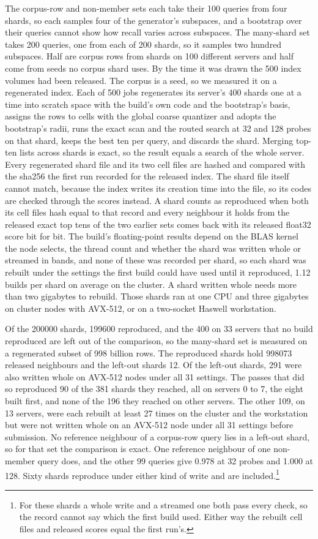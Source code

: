 \documentclass[sigconf, nonacm]{acmart}
\begin{document}
The corpus-row and non-member sets each take their 100 queries from four shards, so each samples
four of the generator's subspaces, and a bootstrap over their queries cannot show how recall varies
across subspaces. The many-shard set takes 200 queries, one from each of 200 shards, so it samples
two hundred subspaces. Half are corpus rows from shards on 100 different servers and half come from
seeds no corpus shard uses. By the time it was drawn the 500 index volumes had been released. The corpus is
a seed, so we measured it on a regenerated index. Each of 500 jobs regenerates its server's 400
shards one at a time into scratch space with the build's own code and the bootstrap's basis,
assigns the rows to cells with the global coarse quantizer and adopts the bootstrap's radii, runs
the exact scan and the routed search at 32 and 128 probes on that shard, keeps the best ten per
query, and discards the shard. Merging top-ten lists across shards is exact, so the result equals
a search of the whole server. Every regenerated shard file and its two cell files are hashed and
compared with the sha256 the first run recorded for the released index. The shard file itself
cannot match, because the index writes its creation time into the file, so its codes are checked
through the scores instead. A shard counts as
reproduced when both its cell files hash equal to that record and every neighbour it holds from the
released exact top tens of the two earlier sets comes back with its released float32 score bit for
bit. The build's floating-point results depend on the BLAS kernel the node selects, the thread count
and whether the shard was written whole or streamed in bands, and none of these was recorded per
shard, so each shard was rebuilt under the settings the first build could have used until it
reproduced, 1.12 builds per shard on average on the cluster. A shard written whole needs more than
two gigabytes to rebuild. Those shards ran at one CPU and three gigabytes on cluster nodes with
AVX-512, or on a two-socket Haswell workstation.

Of the 200000 shards, 199600 reproduced, and the 400 on 33 servers that no build
reproduced are left out of the comparison, so the many-shard set is measured on a regenerated
subset of 998 billion rows. The reproduced shards hold 998073 released neighbours
and the left-out shards 12. Of the left-out shards, 291 were also written whole on
AVX-512 nodes under all 31 settings. The passes that did so reproduced 90 of the 381 shards
they reached, all on servers 0 to 7, the eight built first, and none of the 196 they reached
on other servers. The other 109, on 13 servers, were each rebuilt at least
27 times on the cluster and the workstation but were not written whole on an AVX-512 node
under all 31 settings before submission. No reference neighbour of a corpus-row query lies in a left-out shard, so for
that set the comparison is exact. One reference neighbour of one non-member query does, and the
other 99 queries give 0.978 at 32 probes and 1.000 at 128. Sixty shards reproduce under
either kind of write and are included.\footnote{For these shards a whole write and a streamed one
both pass every check, so the record cannot say which the first build used. Either way the rebuilt
cell files and released scores equal the first run's.}
\end{document}
